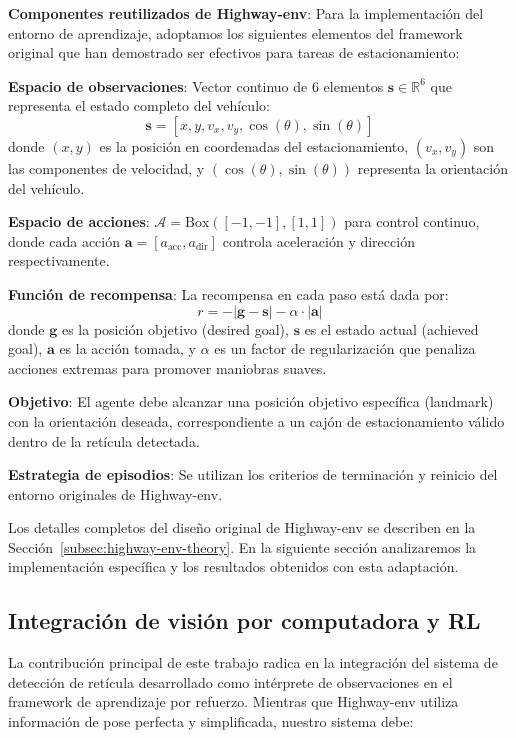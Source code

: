 \textbf{Componentes reutilizados de Highway-env}: Para la implementación del entorno de aprendizaje, 
adoptamos los siguientes elementos del framework original que han demostrado ser efectivos para 
tareas de estacionamiento:

\textbf{Espacio de observaciones}: Vector continuo de 6 elementos $\mathbf{s} \in \mathbb{R}^6$ que representa
el estado completo del vehículo:
\begin{equation}
\mathbf{s} = [x, y, v_x, v_y, \cos(\theta), \sin(\theta)]
\end{equation}
donde $(x, y)$ es la posición en coordenadas del estacionamiento, $(v_x, v_y)$ son las componentes 
de velocidad, y $(\cos(\theta), \sin(\theta))$ representa la orientación del vehículo.

\textbf{Espacio de acciones}: $\mathcal{A} = \text{Box}([-1, -1], [1, 1])$ para control continuo, 
donde cada acción $\mathbf{a} = [a_{\text{acc}}, a_{\text{dir}}]$ controla aceleración y dirección 
respectivamente.

\textbf{Función de recompensa}: La recompensa en cada paso está dada por:
\begin{equation}
r = -|\mathbf{g} - \mathbf{s}| - \alpha \cdot |\mathbf{a}|
\end{equation}
donde $\mathbf{g}$ es la posición objetivo (desired goal), $\mathbf{s}$ es el estado actual 
(achieved goal), $\mathbf{a}$ es la acción tomada, y $\alpha$ es un factor de regularización 
que penaliza acciones extremas para promover maniobras suaves.

\textbf{Objetivo}: El agente debe alcanzar una posición objetivo específica (landmark) con la 
orientación deseada, correspondiente a un cajón de estacionamiento válido dentro de la retícula detectada.

\textbf{Estrategia de episodios}: Se utilizan los criterios de terminación y reinicio del entorno 
originales de Highway-env.


Los detalles completos del diseño original de Highway-env se describen en la
Sección~\ref{subsec:highway-env-theory}. En la siguiente sección analizaremos
la implementación específica y los resultados obtenidos con esta adaptación.

\subsection{Integración de visión por computadora y RL}\label{subsec:rl-integration}

La contribución principal de este trabajo radica en la integración del sistema de
detección de retícula desarrollado como intérprete de observaciones en el framework
de aprendizaje por refuerzo. Mientras que Highway-env utiliza información de pose
perfecta y simplificada, nuestro sistema debe:


